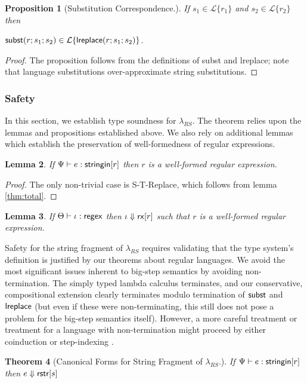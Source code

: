 \documentclass[9pt]{sig-alternate}
\newtheorem{thm}{Theorem}
\newtheorem{lem}[thm]{Lemma}
\newtheorem{prop}[thm]{Proposition}
\theoremstyle{definition}
\newcommand{\Lagr}{\mathcal{L}}
\newcommand{\lang}[1]{\Lagr\{#1\}}
\newcommand{\lambdas}{\lambda_{RS}}
\newcommand{\stringin}[1]{{\sf stringin}[#1]}
\newcommand{\rx}[1]{ {\sf rx}[#1] }
\newcommand{\regex}{{\sf regex}}
\newcommand{\lsubst}[3]{{\sf subst}(#1;#2;#3)} %
\newcommand{\lreplace}[3]{{\sf lreplace}(#1; #2; #3)}
\newcommand{\sctx}{\Psi} %
\newcommand{\tctx}{\Theta} %
\newcommand{\treduces}{ \Downarrow }
\newcommand{\sreduces}{ \Downarrow }
\begin{document}
\begin{prop}[Substitution Correspondence.] \label{thm:substcorrespondence}
  If $s_1 \in \lang{r_1}$ and $s_2 \in \lang{r_2}$ then

  $\lsubst{r}{s_1}{s_2} \in \lang{\lreplace{r}{s_1}{s_2}}$.
\end{prop}
\begin{proof}
The proposition follows from the definitions of subst and lreplace; note that language substitutions over-approximate string substitutions.
\end{proof}

\subsubsection{Safety}

In this section, we establish type soundness for $\lambdas$.
The theorem relies upon the lemmas and propositions established above.
We also rely on additional lemmas which establish the preservation of well-formedness
of regular expressions.

\begin{lem}
  If $\sctx \vdash e : \stringin{r}$ then $r$ is a well-formed regular expression.
\end{lem}
\begin{proof}
  The only non-trivial case is S-T-Replace, which follows from lemma \ref{thm:total}. 
\end{proof}
\begin{lem}
If $\tctx \vdash \iota : \regex$ then $\iota \treduces \rx{r}$ such that $r$ is a well-formed regular expression. 
\end{lem}

Safety for the string fragment of $\lambdas$ requires validating that the type system's definition is justified
by our theorems about regular languages.
We avoid the most significant issues inherent to big-step semantics by avoiding non-termination.
The simply typed lambda calculus terminates, and our conservative, compositional extension clearly
terminates modulo termination of ${\sf subst}$ and ${\sf lreplace}$ (but even if these were non-terminating, this still does not pose a problem for the big-step semantics itself).
However, a more careful treatment or treatment for a language with non-termination might proceed by either coinduction \cite{coinductionoo, coinduction} or step-indexing \cite{stepindexing}.

\begin{thm}[Canonical Forms for String Fragment of $\lambdas$.]\label{thm:cfs}
  If $\sctx \vdash e : \stringin{r}$ 
  then $e \sreduces \rstr{s}$ 
\end{thm}
\end{document}
